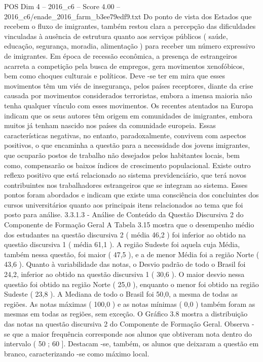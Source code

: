 \begin{textsample}{POS Dim 4 – 2016\_c6 – Score 4.00 – 2016\_c6/enade\_2016\_farm\_b3ee79edf9.txt}
Do ponto de vista dos Estados que recebem o fluxo de imigrantes, também restou clara a percepção das dificuldades vinculadas à ausência de estrutura quanto aos serviços públicos ( saúde, educação, segurança, moradia, alimentação ) para receber um número expressivo de imigrantes.
Em época de recessão econômica, a presença de estrangeiros acarreta a competição pela busca de empregos, gera movimentos xenofóbicos, bem como choques culturais e políticos.
Deve -se ter em mira que esses movimentos têm um viés de insegurança, pelos países receptores, diante da crise causada por movimentos considerados terroristas, embora a imensa maioria não tenha qualquer vínculo com esses movimentos.
Os recentes atentados na Europa indicam que os seus autores têm origem em comunidades de imigrantes, embora muitos já tenham nascido nos países da comunidade europeia.
Essas características negativas, no entanto, paradoxalmente, convivem com aspectos positivos, o que encaminha a questão para a necessidade dos jovens imigrantes, que ocuparão postos de trabalho não desejados pelos habitantes locais, bem como, compensarão os baixos índices de crescimento populacional.
Existe outro reflexo positivo que está relacionado ao sistema previdenciário, que terá novos contribuintes nos trabalhadores estrangeiros que se integram ao sistema.
Esses pontos foram abordados e indicam que existe uma consciência dos concluintes dos cursos universitários quanto aos principais itens relacionados ao tema que foi posto para análise. 3.3.1.3 - Análise de Conteúdo da Questão Discursiva 2 do Componente de Formação Geral A Tabela 3.15 mostra que o desempenho médio dos estudantes na questão discursiva 2 ( média 46,2 ) foi inferior ao obtido na questão discursiva 1 ( média 61,1 ).
A região Sudeste foi aquela cuja Média, também nessa questão, foi maior ( 47,5 ), e a de menor Média foi a região Norte ( 43,6 ).
Quanto à variabilidade das notas, o Desvio padrão de todo o Brasil foi 24,2, inferior ao obtido na questão discursiva 1 ( 30,6 ).
O maior desvio nessa questão foi obtido na região Norte ( 25,0 ), enquanto o menor foi obtido na região Sudeste ( 23,8 ).
A Mediana de todo o Brasil foi 50,0, a mesma de todas as regiões.
As notas máximas ( 100,0 ) e as notas mínimas ( 0,0 ) também foram as mesmas em todas as regiões, sem exceção.
O Gráfico 3.8 mostra a distribuição das notas na questão discursiva 2 do Componente de Formação Geral.
Observa -se que a maior frequência corresponde aos alunos que obtiveram nota dentro do intervalo ( 50 ; 60 ].
Destacam -se, também, os alunos que deixaram a questão em branco, caracterizando -se como máximo local.

\end{textsample}
